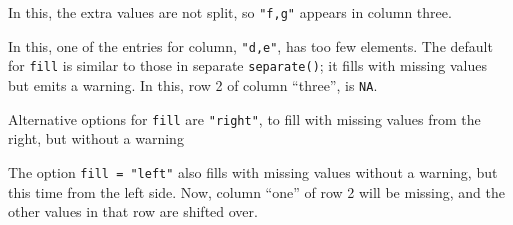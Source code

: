 \documentclass[]{book}
\newenvironment{Shaded}{\begin{snugshade}}{\end{snugshade}}
\newcommand{\CommentTok}[1]{\textcolor[rgb]{0.56,0.35,0.01}{\textit{#1}}}
\newcommand{\DataTypeTok}[1]{\textcolor[rgb]{0.13,0.29,0.53}{#1}}
\newcommand{\KeywordTok}[1]{\textcolor[rgb]{0.13,0.29,0.53}{\textbf{#1}}}
\newcommand{\NormalTok}[1]{#1}
\newcommand{\OperatorTok}[1]{\textcolor[rgb]{0.81,0.36,0.00}{\textbf{#1}}}
\newcommand{\StringTok}[1]{\textcolor[rgb]{0.31,0.60,0.02}{#1}}
\theoremstyle{plain}
\theoremstyle{remark}
\begin{document}
In this, the extra values are not split, so \texttt{"f,g"} appears in
column three.

In this, one of the entries for column, \texttt{"d,e"}, has too few
elements. The default for \texttt{fill} is similar to those in separate
\texttt{separate()}; it fills with missing values but emits a warning.
In this, row 2 of column ``three'', is \texttt{NA}.

\begin{Shaded}
\end{Shaded}

Alternative options for \texttt{fill} are \texttt{"right"}, to fill with
missing values from the right, but without a warning

\begin{Shaded}
\end{Shaded}

The option \texttt{fill\ =\ "left"} also fills with missing values
without a warning, but this time from the left side. Now, column ``one''
of row 2 will be missing, and the other values in that row are shifted
over.
\end{document}
